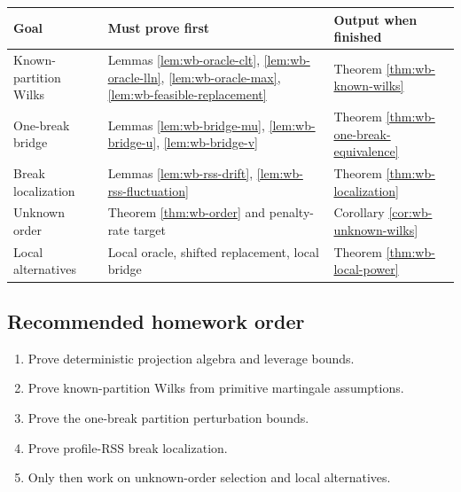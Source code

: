 \documentclass[12pt]{article}
\numberwithin{equation}{section}
\theoremstyle{definition}
\begin{document}
\begin{center}
\begin{tabular}{>{\raggedright\arraybackslash}p{}
                >{\raggedright\arraybackslash}p{}
                >{\raggedright\arraybackslash}p{}}
\hline
Goal & Must prove first & Output when finished \\
\hline
Known-partition Wilks & Lemmas \ref{lem:wb-oracle-clt}, \ref{lem:wb-oracle-lln}, \ref{lem:wb-oracle-max}, \ref{lem:wb-feasible-replacement} & Theorem \ref{thm:wb-known-wilks} \\
One-break bridge & Lemmas \ref{lem:wb-bridge-mu}, \ref{lem:wb-bridge-u}, \ref{lem:wb-bridge-v} & Theorem \ref{thm:wb-one-break-equivalence} \\
Break localization & Lemmas \ref{lem:wb-rss-drift}, \ref{lem:wb-rss-fluctuation} & Theorem \ref{thm:wb-localization} \\
Unknown order & Theorem \ref{thm:wb-order} and penalty-rate target & Corollary \ref{cor:wb-unknown-wilks} \\
Local alternatives & Local oracle, shifted replacement, local bridge & Theorem \ref{thm:wb-local-power} \\
\hline
\end{tabular}
\end{center}

\subsection*{Recommended homework order}
\begin{enumerate}
    \item Prove deterministic projection algebra and leverage bounds.
    \item Prove known-partition Wilks from primitive martingale assumptions.
    \item Prove the one-break partition perturbation bounds.
    \item Prove profile-RSS break localization.
    \item Only then work on unknown-order selection and local alternatives.
\end{enumerate}
\end{document}
